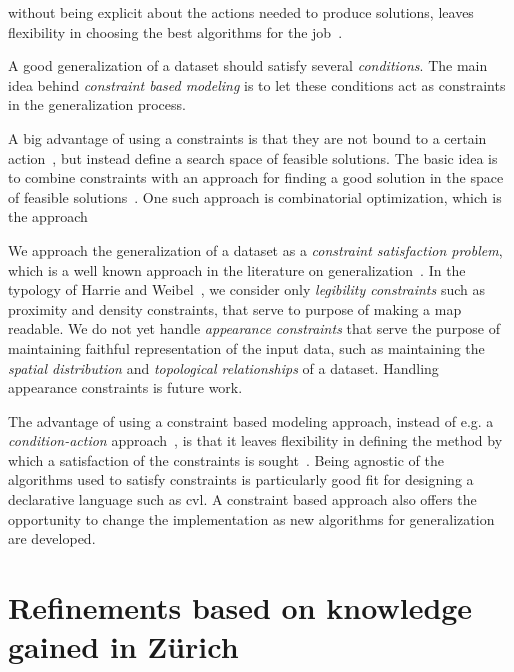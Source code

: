 \documentclass[11pt, oneside]{article}   	%
\begin{document}
without being explicit about the actions needed to produce solutions, leaves flexibility in choosing the best algorithms for the job~\cite{beard1991constraints}.

A good generalization of a dataset should satisfy several \emph{conditions}. The main idea behind \emph{constraint based modeling} is to let these conditions act as constraints in the generalization process.


 A big advantage of using a constraints is that they are not bound to a certain action~\cite{beard1991constraints}, but instead define a search space of feasible solutions. The basic idea is to combine constraints with an approach for finding a good solution in the space of feasible solutions~\cite{harrie2007modelling}. One such approach is combinatorial optimization, which is the approach 




We approach the generalization of a dataset as a \emph{constraint satisfaction problem}, which is a well known approach in the literature on generalization~\cite{beard1991constraints,harrie1999constraint}. In the typology of Harrie and Weibel~\cite{harrie2007modelling}, we consider only \emph{legibility constraints} such as proximity and density constraints, that serve to purpose of making a map readable. We do not yet handle \emph{appearance constraints} that serve the purpose of maintaining faithful representation of the input data, such as maintaining the \emph{spatial distribution} and \emph{topological relationships} of a dataset. Handling appearance constraints is future work.

The advantage of using a constraint based modeling approach, instead of e.g. a \emph{condition-action} approach~\cite{harrie2007modelling}, is that it leaves flexibility in defining the method by which a satisfaction of the constraints is sought~\cite{beard1991constraints}. Being agnostic of the algorithms used to satisfy constraints is particularly good fit for designing a declarative language such as cvl. A constraint based approach also offers the opportunity to change the implementation as new algorithms for generalization are developed.


\section{Refinements based on knowledge gained in Z\"{u}rich}
\end{document}
